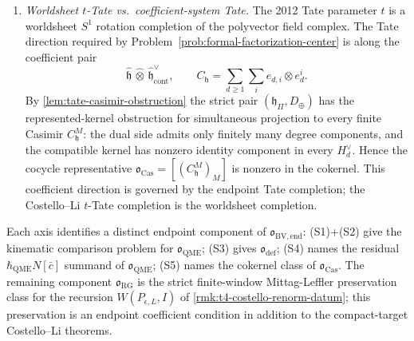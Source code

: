 \begin{prop}
\begin{enumerate}
      cocycle in the stated Costello--Li BV complex.
    \item[(S5)] \emph{Worldsheet \(t\)-Tate vs.\ coefficient-system
      Tate.}  The 2012 Tate parameter \(t\) is a worldsheet \(S^1\)
      rotation completion of the polyvector field complex.  The Tate
      direction required by
      Problem~\ref{prob:formal-factorization-center} is along the
      coefficient pair
      \[
        \widehat{\mathfrak h}\,\widehat\otimes\,
        \widehat{\mathfrak h}^{\vee}_{\mathrm{cont}},
        \qquad
        C_{\mathfrak h}=\sum_{d\ge1}\sum_ie_{d,i}\otimes e^i_d.
      \]
      By \ref{lem:tate-casimir-obstruction} the strict pair
      \((\mathfrak h_\Pi,D_\oplus)\) has the represented-kernel
      obstruction for simultaneous projection to every finite Casimir
      \(C^M_{\mathfrak h}\): the dual side admits only finitely many
      degree components, and the compatible kernel has nonzero
      identity component in every \(H_d^\vee\).  Hence the cocycle
      representative
      \(\mathfrak o_{\mathrm{Cas}}=[(C^M_{\mathfrak h})_M]\) is nonzero
      in the cokernel.  This coefficient direction is governed by
      the endpoint Tate completion; the Costello--Li \(t\)-Tate
      completion is the worldsheet completion.
  \end{enumerate}

  Each axis identifies a distinct endpoint component of
  \(\mathfrak o_{\mathrm{BV,end}}\): (S1)+(S2) give the kinematic
  comparison problem for \(\mathfrak o_{\mathrm{QME}}\); (S3) gives
  \(\mathfrak o_{\mathrm{def}}\);
  (S4) names the residual \(\hbar_{\mathrm{QME}} N[\bar c]\) summand of
  \(\mathfrak o_{\mathrm{QME}}\); (S5) names the cokernel class of
  \(\mathfrak o_{\mathrm{Cas}}\).  The remaining component
  \(\mathfrak o_{\mathrm{RG}}\) is the strict finite-window
  Mittag-Leffler preservation class for the recursion
  \(W(P_{\epsilon,L},I)\) of \ref{rmk:t4-costello-renorm-datum}; this
  preservation is an endpoint coefficient condition in addition to the
  compact-target Costello--Li theorems.
\end{prop}

